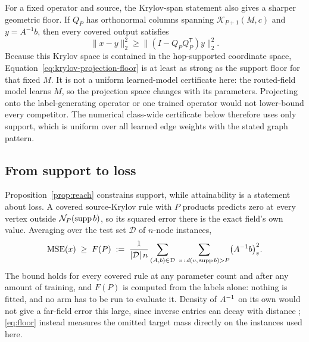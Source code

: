 For a fixed operator and source, the Krylov-span statement also gives a
sharper geometric floor. If $Q_P$ has orthonormal columns spanning
$\mathcal K_{P+1}(M,c)$ and $y=A^{-1}b$, then every covered output satisfies
\begin{equation}
  \|x-y\|_2^2 \geq \|(I-Q_PQ_P^{\mathsf T})y\|_2^2.
  \label{eq:krylov-projection-floor}
\end{equation}
Because this Krylov space is contained in the hop-supported coordinate space,
Equation~\eqref{eq:krylov-projection-floor} is at least as strong as the
support floor for that fixed $M$. It is not a uniform learned-model
certificate here: the routed-field model learns $M$, so the projection space
changes with its parameters. Projecting onto the label-generating operator or
one trained operator would not lower-bound every competitor. The numerical
class-wide certificate below therefore uses only support, which is uniform
over all learned edge weights with the stated graph pattern.

\subsection{From support to loss}
\label{app:floor}

Proposition~\ref{prop:reach} constrains support, while attainability is a
statement about loss. A covered source-Krylov rule with $P$ products predicts
zero at every vertex outside $\mathcal{N}_{P}(\operatorname{supp} b)$, so its squared error there is
the exact field's own value.
Averaging over the test set $\mathcal{D}$ of $n$-node instances,
\begin{equation}
\label{eq:floor}
\mathrm{MSE}(x)\;\geq\;F(P)\;:=\;\frac{1}{|\mathcal{D}|\,n}
\sum_{(A,b)\in\mathcal{D}}\;\sum_{v\,:\,d(v,\,\operatorname{supp} b)>P}
\bigl(A^{-1}b\bigr)_{v}^{2}.
\end{equation}
The bound holds for every covered rule at any parameter count and after any
amount of training, and $F(P)$ is computed from the labels alone: nothing is
fitted, and no arm has to be run to evaluate it. Density of $A^{-1}$ on its own
would not give a far-field error this large, since inverse entries can decay with
distance \citep{demko1984decay,benzi2007decay}; \eqref{eq:floor} instead measures
the omitted target mass directly on the instances used here.

